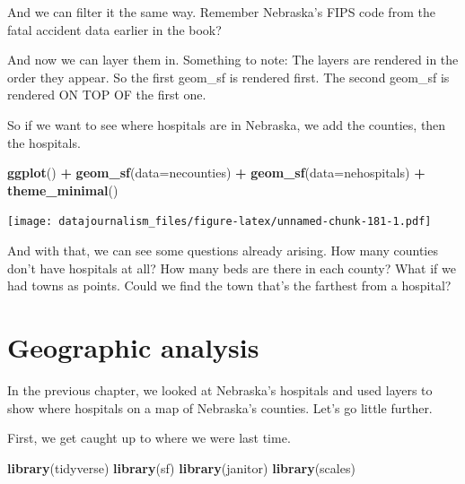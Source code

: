 \documentclass[]{book}
\newenvironment{Shaded}{\begin{snugshade}}{\end{snugshade}}
\newcommand{\DataTypeTok}[1]{\textcolor[rgb]{0.13,0.29,0.53}{#1}}
\newcommand{\KeywordTok}[1]{\textcolor[rgb]{0.13,0.29,0.53}{\textbf{#1}}}
\newcommand{\NormalTok}[1]{#1}
\newcommand{\OperatorTok}[1]{\textcolor[rgb]{0.81,0.36,0.00}{\textbf{#1}}}
\newcommand{\StringTok}[1]{\textcolor[rgb]{0.31,0.60,0.02}{#1}}
\begin{document}
And we can filter it the same way. Remember Nebraska's FIPS code from the fatal accident data earlier in the book?

\begin{Shaded}
\end{Shaded}

And now we can layer them in. Something to note: The layers are rendered in the order they appear. So the first geom\_sf is rendered first. The second geom\_sf is rendered ON TOP OF the first one.

So if we want to see where hospitals are in Nebraska, we add the counties, then the hospitals.

\begin{Shaded}
\begin{Highlighting}[]
\KeywordTok{ggplot}\NormalTok{() }\OperatorTok{+}\StringTok{ }\KeywordTok{geom_sf}\NormalTok{(}\DataTypeTok{data=}\NormalTok{necounties) }\OperatorTok{+}\StringTok{ }\KeywordTok{geom_sf}\NormalTok{(}\DataTypeTok{data=}\NormalTok{nehospitals) }\OperatorTok{+}\StringTok{ }\KeywordTok{theme_minimal}\NormalTok{()}
\end{Highlighting}
\end{Shaded}

\texttt{[image: datajournalism\_files/figure-latex/unnamed-chunk-181-1.pdf]}

And with that, we can see some questions already arising. How many counties don't have hospitals at all? How many beds are there in each county? What if we had towns as points. Could we find the town that's the farthest from a hospital?

\hypertarget{geographic-analysis}{%
\chapter{Geographic analysis}\label{geographic-analysis}}

In the previous chapter, we looked at Nebraska's hospitals and used layers to show where hospitals on a map of Nebraska's counties. Let's go little further.

First, we get caught up to where we were last time.

\begin{Shaded}
\begin{Highlighting}[]
\KeywordTok{library}\NormalTok{(tidyverse)}
\KeywordTok{library}\NormalTok{(sf)}
\KeywordTok{library}\NormalTok{(janitor)}
\KeywordTok{library}\NormalTok{(scales)}
\end{Highlighting}
\end{Shaded}
\end{document}
